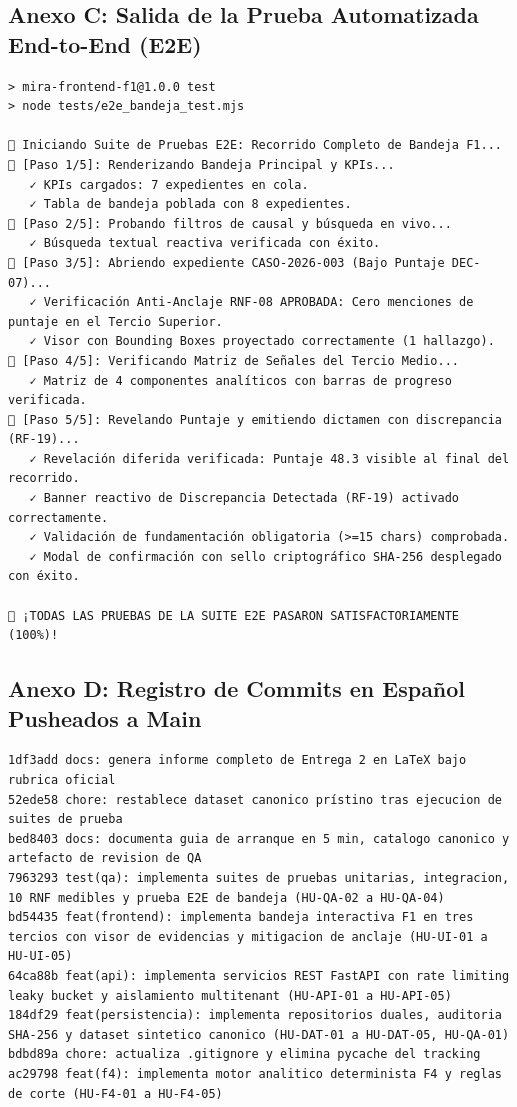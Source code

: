 \documentclass[11pt,letterpaper]{article}
\begin{document}
\subsection{Anexo C: Salida de la Prueba Automatizada End-to-End (E2E)}
\begin{verbatim}
> mira-frontend-f1@1.0.0 test
> node tests/e2e_bandeja_test.mjs

🧪 Iniciando Suite de Pruebas E2E: Recorrido Completo de Bandeja F1...
📌 [Paso 1/5]: Renderizando Bandeja Principal y KPIs...
   ✓ KPIs cargados: 7 expedientes en cola.
   ✓ Tabla de bandeja poblada con 8 expedientes.
📌 [Paso 2/5]: Probando filtros de causal y búsqueda en vivo...
   ✓ Búsqueda textual reactiva verificada con éxito.
📌 [Paso 3/5]: Abriendo expediente CASO-2026-003 (Bajo Puntaje DEC-07)...
   ✓ Verificación Anti-Anclaje RNF-08 APROBADA: Cero menciones de puntaje en el Tercio Superior.
   ✓ Visor con Bounding Boxes proyectado correctamente (1 hallazgo).
📌 [Paso 4/5]: Verificando Matriz de Señales del Tercio Medio...
   ✓ Matriz de 4 componentes analíticos con barras de progreso verificada.
📌 [Paso 5/5]: Revelando Puntaje y emitiendo dictamen con discrepancia (RF-19)...
   ✓ Revelación diferida verificada: Puntaje 48.3 visible al final del recorrido.
   ✓ Banner reactivo de Discrepancia Detectada (RF-19) activado correctamente.
   ✓ Validación de fundamentación obligatoria (>=15 chars) comprobada.
   ✓ Modal de confirmación con sello criptográfico SHA-256 desplegado con éxito.

🎉 ¡TODAS LAS PRUEBAS DE LA SUITE E2E PASARON SATISFACTORIAMENTE (100%)!
\end{verbatim}

\subsection{Anexo D: Registro de Commits en Español Pusheados a Main}
\begin{verbatim}
1df3add docs: genera informe completo de Entrega 2 en LaTeX bajo rubrica oficial
52ede58 chore: restablece dataset canonico prístino tras ejecucion de suites de prueba
bed8403 docs: documenta guia de arranque en 5 min, catalogo canonico y artefacto de revision de QA
7963293 test(qa): implementa suites de pruebas unitarias, integracion, 10 RNF medibles y prueba E2E de bandeja (HU-QA-02 a HU-QA-04)
bd54435 feat(frontend): implementa bandeja interactiva F1 en tres tercios con visor de evidencias y mitigacion de anclaje (HU-UI-01 a HU-UI-05)
64ca88b feat(api): implementa servicios REST FastAPI con rate limiting leaky bucket y aislamiento multitenant (HU-API-01 a HU-API-05)
184df29 feat(persistencia): implementa repositorios duales, auditoria SHA-256 y dataset sintetico canonico (HU-DAT-01 a HU-DAT-05, HU-QA-01)
bdbd89a chore: actualiza .gitignore y elimina pycache del tracking
ac29798 feat(f4): implementa motor analitico determinista F4 y reglas de corte (HU-F4-01 a HU-F4-05)
\end{verbatim}
\end{document}
